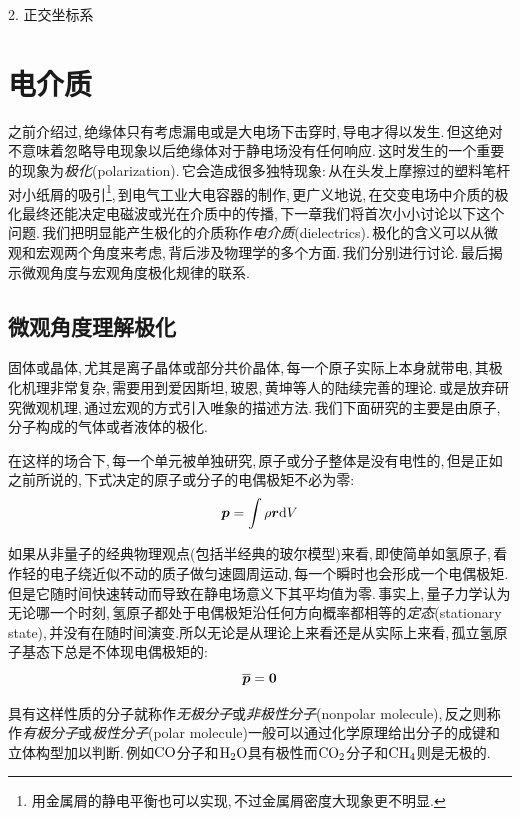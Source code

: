 \vspace{0.2cm}
2. 正交坐标系
\vspace{0.2cm}


\section{电介质}

之前介绍过,\,绝缘体只有考虑漏电或是大电场下击穿时,\,导电才得以发生.\,但这绝对不意味着忽略导电现象以后绝缘体对于静电场没有任何响应.\,这时发生的一个重要的现象为\emph{极化}(polarization).\,它会造成很多独特现象:\,从在头发上摩擦过的塑料笔杆对小纸屑的吸引\footnote{用金属屑的静电平衡也可以实现,\,不过金属屑密度大现象更不明显.},\,到电气工业大电容器的制作,\,更广义地说,\,在交变电场中介质的极化最终还能决定电磁波或光在介质中的传播,\,下一章我们将首次小小讨论以下这个问题.\,我们把明显能产生极化的介质称作\emph{电介质}(dielectrics).\,极化的含义可以从微观和宏观两个角度来考虑,\,背后涉及物理学的多个方面.\,我们分别进行讨论.\,最后揭示微观角度与宏观角度极化规律的联系.\,

\subsection{微观角度理解极化}

固体或晶体,\,尤其是离子晶体或部分共价晶体,\,每一个原子实际上本身就带电,\,其极化机理非常复杂,\,需要用到爱因斯坦,\,玻恩,\,黄坤等人的陆续完善的理论.\,或是放弃研究微观机理,\,通过宏观的方式引入唯象的描述方法.\,我们下面研究的主要是由原子,\,分子构成的气体或者液体的极化.

在这样的场合下,\,每一个单元被单独研究,\,原子或分子整体是没有电性的,\,但是正如之前所说的,\,下式决定的原子或分子的电偶极矩不必为零:
\[\boldsymbol{p}=\int \rho \boldsymbol{r} \textrm{d} V\]

如果从非量子的经典物理观点(包括半经典的玻尔模型)来看,\,即使简单如氢原子,\,看作轻的电子绕近似不动的质子做匀速圆周运动,\,每一个瞬时也会形成一个电偶极矩.\,但是它随时间快速转动而导致在静电场意义下其平均值为零.\,事实上,\,量子力学认为无论哪一个时刻,\,氢原子都处于电偶极矩沿任何方向概率都相等的\emph{定态}(stationary state),\,并没有在随时间演变.\.所以无论是从理论上来看还是从实际上来看,\,孤立氢原子基态下总是不体现电偶极矩的:
\[\overline{\boldsymbol{p}}=\boldsymbol{0}\]

具有这样性质的分子就称作\emph{无极分子}或\emph{非极性分子}(nonpolar molecule),\,反之则称作\emph{有极分子}或\emph{极性分子}(polar molecule)一般可以通过化学原理给出分子的成键和立体构型加以判断.\,例如${\rm CO}$分子和${\rm H_2 O}$具有极性而${\rm CO_2}$分子和${\rm CH_4}$则是无极的.

